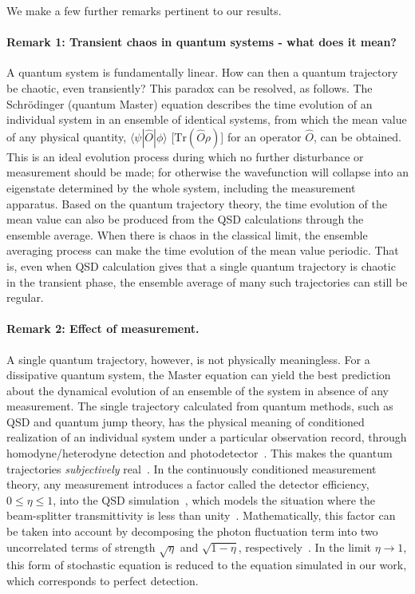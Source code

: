 \documentclass[12pt]{wlscirep}
\begin{document}
We make a few further remarks pertinent to our results.

\paragraph*{Remark 1: Transient chaos in quantum systems - what
does it mean?} A quantum system is fundamentally linear. How can then a
quantum trajectory be chaotic, even transiently? This paradox can be 
resolved, as follows. The Schr\"{o}dinger (quantum Master) equation
describes the time evolution of an individual system in an ensemble
of identical systems, from which the mean value of any physical quantity,
$\langle\psi|\hat{O}|\phi\rangle$
[$\mbox{Tr}(\hat{O}\rho)$] for an operator $\hat{O}$, can be obtained.
This is an ideal evolution process during which no further
disturbance or measurement should be made; for otherwise the wavefunction
will collapse into an eigenstate determined by the whole system, including
the measurement apparatus. Based on the quantum trajectory theory,
the time evolution of the mean value can also be produced
from the QSD calculations through the ensemble average. When there is chaos
in the classical limit, the ensemble averaging process can make the time
evolution of the mean value periodic. That is, even when QSD calculation gives
that a single quantum trajectory is chaotic in the transient phase, the
ensemble average of many such trajectories can still be regular. 

\paragraph*{Remark 2: Effect of measurement.}
A single quantum trajectory, however, is not physically 
meaningless. For a dissipative quantum system, the Master equation can 
yield the best prediction about the dynamical evolution of an ensemble 
of the system in absence of any measurement. The single trajectory 
calculated from quantum methods, such as QSD and quantum jump 
theory, has the physical meaning of conditioned realization of an individual
system under a particular observation record, through homodyne/heterodyne
detection and photodetector~\cite{PK:1998,W:1996}. This makes the quantum
trajectories {\it subjectively} real~\cite{W:1996}. In the continuously
conditioned measurement theory, any measurement introduces a factor called 
the detector efficiency, $0 \le \eta \le 1$, into the QSD
simulation~\cite{WM:1993a,WM:1993b,DJ:1999,BG:2003}, which models
the situation where the beam-splitter transmittivity is less than
unity~\cite{WM:1993a}. Mathematically, this factor can be taken into 
account by decomposing the photon fluctuation term into two uncorrelated 
terms of strength $\sqrt{\eta}$ and $\sqrt{1-\eta}$,
respectively~\cite{WM:1993a,BG:2003}. In the limit $\eta \rightarrow 1$, this
form of stochastic equation is reduced to the equation simulated in our work,
which corresponds to perfect detection. 
\end{document}
